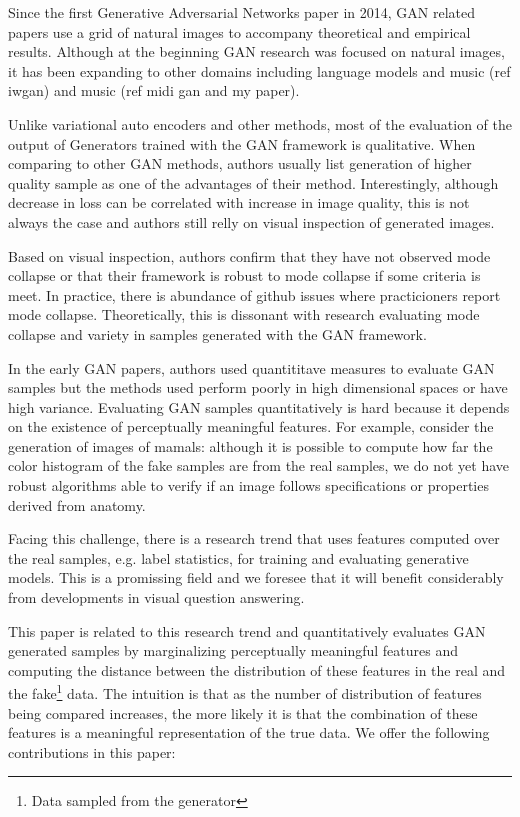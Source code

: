Since the first Generative Adversarial Networks paper in 2014, GAN related
papers use a grid of natural images to accompany theoretical and empirical
results. Although at the beginning GAN research was focused on natural images, 
it has been expanding to other domains including language models and music (ref iwgan) and music
(ref midi gan and my paper). 

Unlike variational auto encoders and other methods, most of the evaluation of the output
of Generators trained with the GAN framework is qualitative. When comparing to other GAN 
methods, authors usually list generation of higher quality sample as one of 
the advantages of their method. Interestingly, although decrease in
loss can be correlated with increase in image quality, this is not always the
case and authors still relly on visual inspection of generated images.

Based on visual inspection, authors confirm that they have not observed
mode collapse or that their framework is robust to mode collapse if some
criteria is meet. In practice, there is abundance of github issues where
practicioners report mode collapse. Theoretically, this is dissonant with
research evaluating mode collapse and variety in samples generated with the
GAN framework.  

In the early GAN papers, authors used quantititave measures to evaluate GAN 
samples but the methods used perform poorly in high dimensional spaces or have 
high variance. Evaluating GAN samples quantitatively is hard because it depends
on the existence of perceptually meaningful features. For example, consider the 
generation of images of mamals: although it is possible to compute how far the
color histogram of the fake samples are from the real samples, we do not yet
have robust algorithms able to verify if an image follows specifications or 
properties derived from anatomy. 

Facing this challenge, there is a research trend that uses features computed over the 
real samples, e.g. label statistics, for training and evaluating generative 
models. This is a promissing field and we foresee that it will benefit
considerably from developments in visual question answering.

This paper is related to this research trend and quantitatively evaluates GAN generated
samples by marginalizing perceptually meaningful features and computing the
distance between the distribution of these features in the real and
the fake\footnote{Data sampled from the generator} data. The intuition is that
as the number of distribution of features being compared increases, the more likely it is
that the combination of these features is a meaningful representation of the true
data. We offer the following contributions in this paper:

